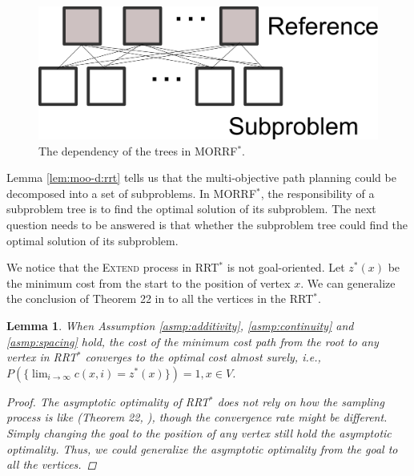 \documentclass{article}
\newtheorem{lem}{Lemma}
\begin{document}
\begin{figure}
\centering
\includegraphics[width=0.7\linewidth]{fig/dependency}
\caption{The dependency of the trees in MORRF$^{*}$.}
\label{fig:dependency}
\end{figure}

Lemma \ref{lem:moo-d:rrt} tells us that the multi-objective path planning could be decomposed into a set of subproblems.
In MORRF$^{*}$, the responsibility of a subproblem tree is to find the optimal solution of its subproblem.
The next question needs to be answered is that whether the subproblem tree could find the optimal solution of its subproblem.

We notice that the \textsc{Extend} process in RRT$^{*}$ is not goal-oriented.
Let $ z^{*}(x) $ be the minimum cost from the start to the position of vertex $ x $.
We can generalize the conclusion of Theorem 22 in \cite{Karaman.Frazzoli:RSS10} to all the vertices in the RRT$^{*}$.
\begin{lem}
\label{lem:tree_vex:conv}
When Assumption \ref{asmp:additivity}, \ref{asmp:continuity} and \ref{asmp:spacing} hold,
the cost of the minimum cost path from the root to any vertex in RRT$^{*}$ converges to the optimal cost almost surely, i.e.,
$
P( \{ \lim_{ i \rightarrow \infty } c(x, i)  = z^{*}(x) \} ) = 1, x \in V $.
\begin{proof}
The asymptotic optimality of RRT$^{*}$ does not rely on how the sampling process is like (Theorem 22, \cite{Karaman.Frazzoli:RSS10}), though the convergence rate might be different.
Simply changing the goal to the position of any vertex still hold the asymptotic optimality.
Thus, we could generalize the asymptotic optimality from the goal to all the vertices.
\end{proof}
\end{lem}
\end{document}
